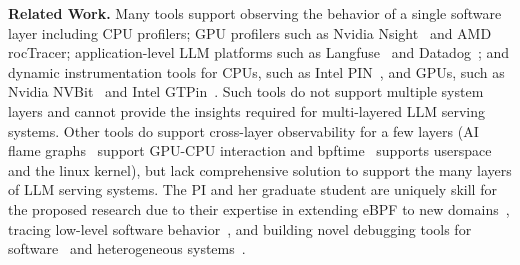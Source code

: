 \noindent \textbf{Related Work.} 
Many tools support observing the behavior of a single software layer including CPU profilers; GPU profilers such as Nvidia Nsight~\cite{nsightsystems} and AMD rocTracer\cite{rocmtracer}; application-level LLM platforms such as Langfuse~\cite{langfuse2025} and Datadog~\cite{datadog2025}; and dynamic instrumentation tools for CPUs, such as Intel PIN~\cite{Luk_2005_pin}, and GPUs, such as Nvidia NVBit~\cite{Villa_2019_NVBit} and Intel GTPin~\cite{Skaletsky_2022_gtpin}.  Such tools do not support multiple system layers and cannot provide the insights required for multi-layered LLM serving systems.  Other tools do support cross-layer observability for a few layers (\eg AI flame graphs~\cite{gregg2024aiflame} support GPU-CPU interaction and bpftime~\cite{zheng2025extending} supports userspace and the linux kernel), but lack comprehensive solution to support the many layers of LLM serving systems.  The PI and her graduate student are uniquely skill for the proposed research due to their expertise in extending eBPF to new domains~\cite{zheng2025extending}, tracing low-level software behavior~\cite{Quinn_2018_sledgehammer}, and building novel debugging tools for software~\cite{Quinn_2022_omnitable} and heterogeneous systems~\cite{Ma_2022_bnw}.

  

